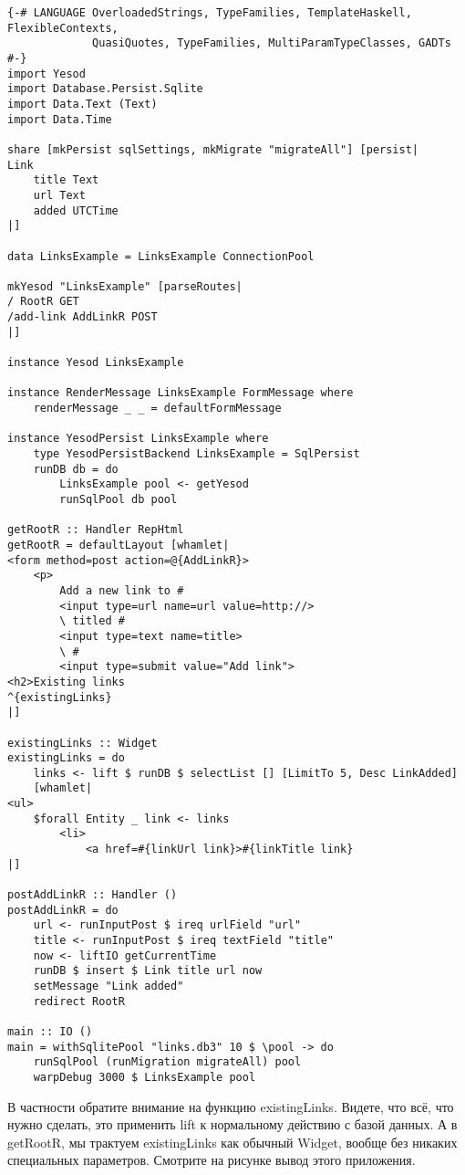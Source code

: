 \begin{lstlisting}
{-# LANGUAGE OverloadedStrings, TypeFamilies, TemplateHaskell, FlexibleContexts,
             QuasiQuotes, TypeFamilies, MultiParamTypeClasses, GADTs #-}
import Yesod
import Database.Persist.Sqlite
import Data.Text (Text)
import Data.Time

share [mkPersist sqlSettings, mkMigrate "migrateAll"] [persist|
Link
    title Text
    url Text
    added UTCTime
|]

data LinksExample = LinksExample ConnectionPool

mkYesod "LinksExample" [parseRoutes|
/ RootR GET
/add-link AddLinkR POST
|]

instance Yesod LinksExample

instance RenderMessage LinksExample FormMessage where
    renderMessage _ _ = defaultFormMessage

instance YesodPersist LinksExample where
    type YesodPersistBackend LinksExample = SqlPersist
    runDB db = do
        LinksExample pool <- getYesod
        runSqlPool db pool

getRootR :: Handler RepHtml
getRootR = defaultLayout [whamlet|
<form method=post action=@{AddLinkR}>
    <p>
        Add a new link to #
        <input type=url name=url value=http://>
        \ titled #
        <input type=text name=title>
        \ #
        <input type=submit value="Add link">
<h2>Existing links
^{existingLinks}
|]

existingLinks :: Widget
existingLinks = do
    links <- lift $ runDB $ selectList [] [LimitTo 5, Desc LinkAdded]
    [whamlet|
<ul>
    $forall Entity _ link <- links
        <li>
            <a href=#{linkUrl link}>#{linkTitle link}
|]

postAddLinkR :: Handler ()
postAddLinkR = do
    url <- runInputPost $ ireq urlField "url"
    title <- runInputPost $ ireq textField "title"
    now <- liftIO getCurrentTime
    runDB $ insert $ Link title url now
    setMessage "Link added"
    redirect RootR

main :: IO ()
main = withSqlitePool "links.db3" 10 $ \pool -> do
    runSqlPool (runMigration migrateAll) pool
    warpDebug 3000 $ LinksExample pool
\end{lstlisting}

В частности обратите внимание на функцию existingLinks. Видете, что всё, что нужно сделать, это применить lift к нормальному действию с базой данных. А в getRootR, мы трактуем existingLinks как обычный Widget, вообще без никаких специальных параметров. Смотрите на рисунке вывод этого приложения.

